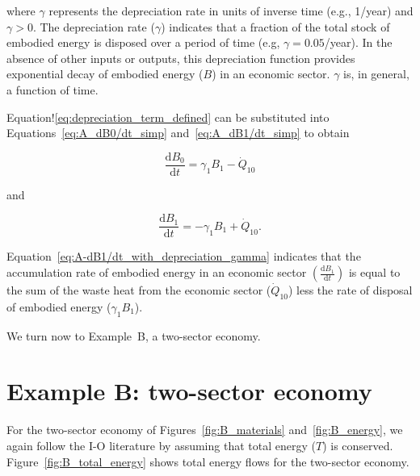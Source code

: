 \noindent where $\gamma$ represents the depreciation rate 
in units of inverse time (e.g., 1/year) and $\gamma > 0$. 
The depreciation rate ($\gamma$) indicates that 
a fraction of the total stock of embodied energy 
is disposed over a period of time (e.g, $\gamma = 0.05$/year). 
In the absence of other inputs or outputs, 
this depreciation function provides exponential decay 
of embodied energy ($B$) in an economic sector. 
$\gamma$ is, in general, a function of time.

Equation!\ref{eq:depreciation_term_defined} 
can be substituted into Equations~\ref{eq:A_dB0/dt_simp}
and~\ref{eq:A_dB1/dt_simp} to obtain 

\begin{equation} \label{eq:A-dB0/dt_with_depreciation_gamma}
	\frac{\mathrm{d}B_{0}}{\mathrm{d}t} 
	= \gamma_{1}B_{1}
	- \dot{Q}_{10} 
\end{equation}

\noindent and

\begin{equation} \label{eq:A-dB1/dt_with_depreciation_gamma}
	\frac{\mathrm{d}B_{1}}{\mathrm{d}t} 
	= - \gamma_{1}B_{1}
	+ \dot{Q}_{10}.
\end{equation}

\noindent Equation~\ref{eq:A-dB1/dt_with_depreciation_gamma} 
indicates that the accumulation rate 
of embodied energy in an economic sector 
$\left( \frac{\mathrm{d}B_{1}}{\mathrm{d}t} \right)$
is equal to the sum of the waste heat from the economic sector 
($\dot{Q}_{10}$) less the rate of disposal of embodied energy 
($\gamma_{1}B_{1}$).

We turn now to Example~B, a two-sector economy.


\section{Example B: two-sector economy} %
\label{sec:Embodied_Energy_Example_B}

For the two-sector economy of Figures~\ref{fig:B_materials}
and~\ref{fig:B_energy}, we again follow the I-O literature 
by assuming that total energy ($T$) is conserved. 
Figure~\ref{fig:B_total_energy} shows total energy
flows for the two-sector economy.


